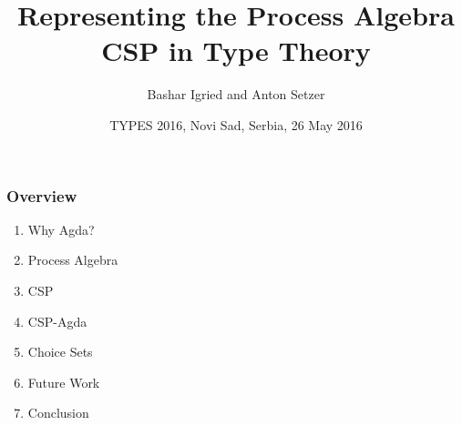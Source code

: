 \documentclass{beamer}
\title[Representing the Process Algebra CSP in Type
Theory]{Representing the Process Algebra CSP in Type
Theory} %
\author{Bashar Igried and Anton Setzer} %
\institute[Swansea University] %
{
Swansea University, Swansea,Wales, UK \\ %
\medskip
\textit{bashar.igried@yahoo.com , a.g.setzer@swansea.ac.uk} %
}
\date{TYPES 2016, Novi Sad, Serbia, 26 May 2016} %
\begin{document}



\begin{frame}
\titlepage
\end{frame}








\begin{frame}
\frametitle{Overview}
\begin{enumerate}

\item Why Agda?
\item Process Algebra 
\item CSP
\item CSP-Agda
\item Choice Sets 
\item Future Work
\item Conclusion
 


\end{enumerate}
\end{frame}









%
%
%
%
%
%
%
%
\end{document}
